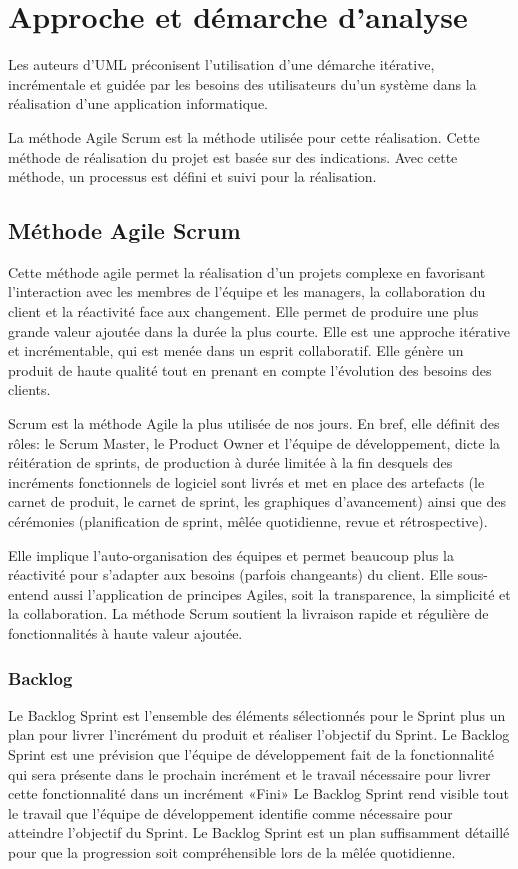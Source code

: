 \section{Approche et démarche d'analyse}

Les auteurs d’UML préconisent l’utilisation d'une démarche itérative, incrémentale et guidée par les besoins des utilisateurs du'un système dans la réalisation d’une application informatique.

La méthode Agile Scrum est la méthode utilisée pour cette réalisation. Cette méthode de réalisation du projet est basée sur des indications. Avec cette méthode, un processus est défini et suivi pour la réalisation.


\subsection{Méthode Agile Scrum}
Cette méthode agile  permet la réalisation d'un projets complexe en favorisant l'interaction avec les membres de l'équipe et les managers, la collaboration du client et la réactivité face aux changement. Elle permet de produire une plus grande 
valeur ajoutée dans la durée la plus  courte. Elle est une approche itérative et incrémentable, qui est menée dans un esprit collaboratif. Elle génère un produit de haute qualité tout en prenant en compte l’évolution des besoins des clients.


Scrum est la méthode Agile la plus utilisée de nos jours. En bref, elle définit des rôles: le Scrum Master, le Product Owner et l’équipe de développement, dicte la réitération de sprints, de production à durée limitée à la fin desquels des incréments fonctionnels de logiciel sont livrés et met en place des artefacts (le carnet de produit, le carnet de sprint, les graphiques d’avancement) ainsi que des cérémonies (planification de sprint, mêlée quotidienne, revue et rétrospective).

Elle implique l’auto-organisation des équipes et permet beaucoup plus la réactivité pour s’adapter aux besoins (parfois changeants) du client. Elle sous-entend aussi l’application de principes Agiles, soit la transparence, la simplicité et la collaboration.
La méthode Scrum soutient la livraison rapide et régulière de fonctionnalités à haute valeur ajoutée.

\subsubsection{Backlog}
Le Backlog Sprint est l’ensemble des éléments sélectionnés pour le Sprint plus un plan pour livrer l’incrément du produit et réaliser l’objectif du Sprint. Le Backlog Sprint est une prévision que l’équipe de développement fait de la fonctionnalité qui sera présente dans le prochain incrément et le travail nécessaire pour livrer cette fonctionnalité dans un incrément «Fini»
Le Backlog Sprint rend visible tout le travail que l'équipe de développement identifie comme nécessaire pour atteindre l'objectif du Sprint.
Le Backlog Sprint est un plan suffisamment détaillé pour que la progression soit compréhensible lors de la mêlée quotidienne.

